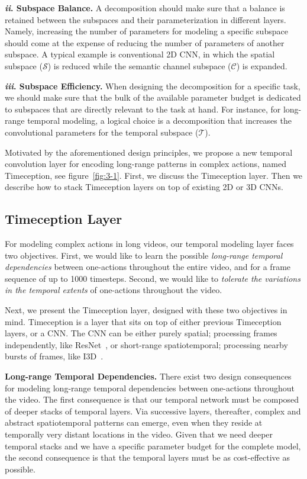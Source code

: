\documentclass[10pt,twocolumn,letterpaper]{article}
\newcommand{\partitle}[1]{\noindent\textbf{#1}}
\begin{document}
\partitle{\textit{ii}. Subspace Balance.}
A decomposition should make sure that a balance is retained between the subspaces and their parameterization in different layers.
Namely, increasing the number of parameters for modeling a specific subspace should come at the expense of reducing the number of parameters of another subspace. 
A typical example is conventional 2D CNN, in which the spatial subspace ($\mathcal{S}$) is reduced while the semantic channel subspace ($\mathcal{C}$) is expanded.

\partitle{\textit{iii}. Subspace Efficiency.}
When designing the decomposition for a specific task, we should make sure that the bulk of the available parameter budget is dedicated to subspaces that are directly relevant to the task at hand.
For instance, for long-range temporal modeling, a logical choice is a decomposition that increases the convolutional parameters for the temporal subspace ($\mathcal{T}$).

Motivated by the aforementioned design principles, we propose a new temporal convolution layer for encoding long-range patterns in complex actions, named Timeception, see figure~\ref{fig:3-1}.
First, we discuss the Timeception layer.
Then we describe how to stack Timeception layers on top of existing 2D or 3D CNNs.

\subsection{Timeception Layer}
For modeling complex actions in long videos, our temporal modeling layer faces two objectives.
First, we would like to learn the possible \emph{long-range temporal dependencies} between one-actions throughout the entire video, and for a frame sequence of up to 1000 timesteps.
Second, we would like to \emph{tolerate the variations in the temporal extents} of one-actions throughout the video.

Next, we present the Timeception layer, designed with these two objectives in mind.
Timeception is a layer that sits on top of either previous Timeception layers, or a CNN.
The CNN can be either purely spatial; processing frames independently, like ResNet~\cite{he2016deep}, or short-range spatiotemporal; processing nearby bursts of frames, like I3D~\cite{carreira2017quo}.

\partitle{Long-range Temporal Dependencies.}
There exist two design consequences for modeling long-range temporal dependencies between one-actions throughout the video. The first consequence is that our temporal network must be composed of deeper stacks of temporal layers.
Via successive layers, thereafter, complex and abstract spatiotemporal patterns can emerge, even when they reside at temporally very distant locations in the video.
Given that we need deeper temporal stacks and we have a specific parameter budget for the complete model, the second consequence is that the temporal layers must be as cost-effective as possible.
\end{document}
